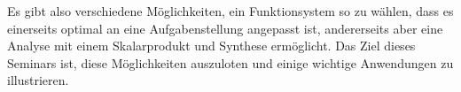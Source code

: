 Es gibt also verschiedene Möglichkeiten, ein Funktionsystem so
zu wählen, dass es einerseits optimal an eine Aufgabenstellung
angepasst ist, andererseits aber eine Analyse mit einem Skalarprodukt
und Synthese ermöglicht.
Das Ziel dieses Seminars ist, diese Möglichkeiten auszuloten
und einige wichtige Anwendungen zu illustrieren.




